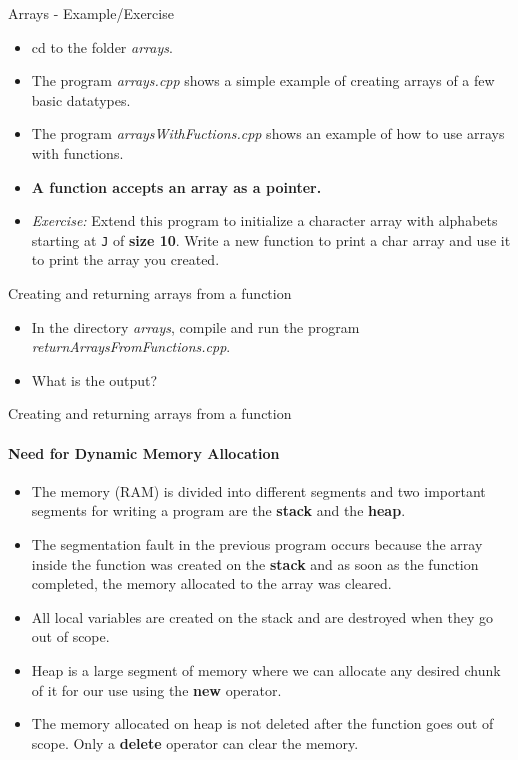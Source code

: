 \documentclass[aspectratio=169]{beamer}
\begin{document}
\begin{frame}[fragile]{Arrays - Example/Exercise}
    \begin{itemize}
        \item cd to the folder \textit{arrays}.
        \item The program \textit{arrays.cpp} shows a simple example of creating arrays of a few basic datatypes.
        \item The program \textit{arraysWithFuctions.cpp} shows an example of how to use arrays with functions.
        \item \textbf{A function accepts an array as a pointer.}
        \item \textit{Exercise:} Extend this program to initialize a character array with alphabets starting at \verb|J| of \textbf{size 10}. Write a new function to print a char array and use it to print the array you created.
    \end{itemize}
\end{frame}

\begin{frame}[fragile]{Creating and returning arrays from a function}
    \begin{itemize}
        \item In the directory \textit{arrays}, compile and run the program \textit{returnArraysFromFunctions.cpp}.
        \item What is the output?
    \end{itemize}
\end{frame}

\begin{frame}[fragile]{Creating and returning arrays from a function}
    \framesubtitle{Need for Dynamic Memory Allocation}
    \begin{itemize}
        \item The memory (RAM) is divided into different segments and two important segments for writing a program are the \textbf{stack} and the \textbf{heap}.
        \item The segmentation fault in the previous program occurs because the array inside the function was created on the \textbf{stack} and as soon as the function completed, the memory allocated to the array was cleared.
        \item All local variables are created on the stack and are destroyed when they go out of scope.
        \item Heap is a large segment of memory where we can allocate any desired chunk of it for our use using the \textbf{new} operator.
        \item The memory allocated on heap is not deleted after the function goes out of scope. Only a \textbf{delete} operator can clear the memory.
    \end{itemize}
\end{frame}
\end{document}
